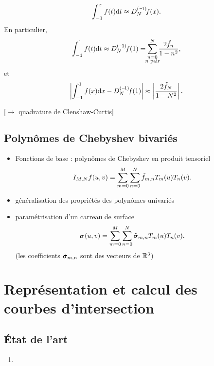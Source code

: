 \begin{equation}
	\int_{-1}^{x} f(t) \dx{t} 
	\approx \interpprim{f}{N}(x).
\end{equation}
En particulier,
\begin{equation}
	\int_{-1}^{1} f(t) \dx{t} 
	\approx 
	\interpprim{f}{N}(1)
	=
	\sum_{\mathclap{\substack{n = 0\\n \text{ pair}}}}^{N} \frac{2 \tilde{f}_n}{1 - n^2},
\end{equation}
et
\begin{equation}
	\left| \int_{-1}^{1} f(x) \dx{x} - \interpprim{f}{N}(1) \right|
	\approx
	\left|\frac{2 \tilde{f}_{N}}{1 - N^2}\right|.
\end{equation}

[$\to$ quadrature de Clenshaw-Curtis]








\subsection{Polynômes de Chebyshev bivariés}
\begin{itemize}
	\item Fonctions de base : polynômes de Chebyshev en produit tensoriel
	\[ \interpolant{f}{M,N}(u,v) = \sum_{m=0}^{M} \sum_{n=0}^{N} \tilde{f}_{m,n} T_m(u) T_n(v). \]
	\item généralisation des propriétés des polynômes univariés
	\item paramétrisation d'un carreau de surface
	\begin{equation}
		\bs(u,v) = \sum_{m=0}^{M} \sum_{n=0}^{N} \tilde{\bs}_{m,n} T_m(u) T_n(v).
	\end{equation}
	(les coefficients $\tilde{\bs}_{m,n}$ sont des vecteurs de $\reals^3$)
\end{itemize}

%

\section{Représentation et calcul des courbes d'intersection}
\subsection{État de l'art}
\begin{enumerate}
	\item 
\end{enumerate}
%

